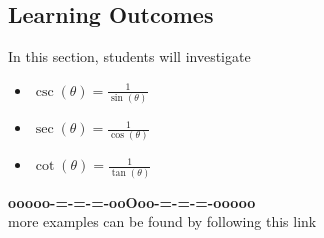 \documentclass{ximera}
\begin{document}
\subsection*{Learning Outcomes}

\begin{sectionOutcomes}
In this section, students will investigate

\begin{itemize}
\item $\csc(\theta) = \frac{1}{\sin(\theta)}$
\item $\sec(\theta) = \frac{1}{\cos(\theta)}$
\item $\cot(\theta) = \frac{1}{\tan(\theta)}$
\end{itemize}
\end{sectionOutcomes}

















\begin{onlineOnly}
\begin{center}
\textbf{\textcolor{green!50!black}{ooooo-=-=-=-ooOoo-=-=-=-ooooo}} \\

more examples can be found by following this link\\ 

\end{center}
\end{onlineOnly}
\end{document}
